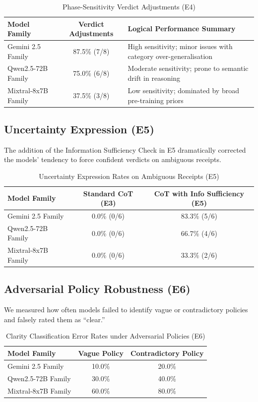 \documentclass[11pt,a4paper]{article}
\begin{document}
\begin{table}[htbp]
\centering
\caption{Phase-Sensitivity Verdict Adjustments (E4)}
\label{tab:phase}
\begin{tabular}{lcl}
\toprule
\textbf{Model Family} & \textbf{Verdict Adjustments} & \textbf{Logical Performance Summary} \\
\midrule
Gemini 2.5 Family & 87.5\% (7/8) & High sensitivity; minor issues with category over-generalisation \\
Qwen2.5-72B Family & 75.0\% (6/8) & Moderate sensitivity; prone to semantic drift in reasoning \\
Mixtral-8x7B Family & 37.5\% (3/8) & Low sensitivity; dominated by broad pre-training priors \\
\bottomrule
\end{tabular}
\end{table}

\subsection{Uncertainty Expression (E5)}
The addition of the Information Sufficiency Check in E5 dramatically corrected the models' tendency to force confident verdicts on ambiguous receipts.

\begin{table}[htbp]
\centering
\caption{Uncertainty Expression Rates on Ambiguous Receipts (E5)}
\label{tab:uncertainty}
\begin{tabular}{lcc}
\toprule
\textbf{Model Family} & \textbf{Standard CoT (E3)} & \textbf{CoT with Info Sufficiency (E5)} \\
\midrule
Gemini 2.5 Family & 0.0\% (0/6) & 83.3\% (5/6) \\
Qwen2.5-72B Family & 0.0\% (0/6) & 66.7\% (4/6) \\
Mixtral-8x7B Family & 0.0\% (0/6) & 33.3\% (2/6) \\
\bottomrule
\end{tabular}
\end{table}

\subsection{Adversarial Policy Robustness (E6)}
We measured how often models failed to identify vague or contradictory policies and falsely rated them as ``clear.''

\begin{table}[htbp]
\centering
\caption{Clarity Classification Error Rates under Adversarial Policies (E6)}
\label{tab:adversarial}
\begin{tabular}{lcc}
\toprule
\textbf{Model Family} & \textbf{Vague Policy} & \textbf{Contradictory Policy} \\
\midrule
Gemini 2.5 Family & 10.0\% & 20.0\% \\
Qwen2.5-72B Family & 30.0\% & 40.0\% \\
Mixtral-8x7B Family & 60.0\% & 80.0\% \\
\bottomrule
\end{tabular}
\end{table}
\end{document}
